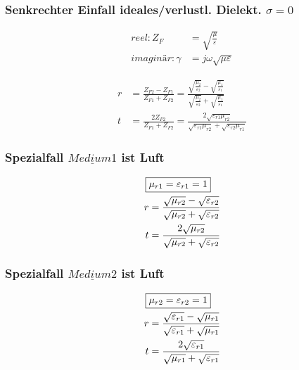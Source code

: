 \subsubsection{Senkrechter Einfall ideales/verlustl. Dielekt. $\sigma = 0$}


\begin{align*}
    reel: Z_F        & = \sqrt{\frac{\mu}{\varepsilon}}   \\
    imaginär: \gamma & = j \omega \sqrt{ \mu \varepsilon}
\end{align*}

\begin{align*}
    r & = \frac{Z_{F2} - Z_{F1}}{Z_{F1} + Z_{F2}} = \frac{\sqrt{\frac{\mu_2}{\varepsilon_2}} - \sqrt{\frac{\mu_1}{\varepsilon_1}}}{\sqrt{\frac{\mu_2}{\varepsilon_2}} + \sqrt{\frac{\mu_1}{\varepsilon_1}}} \\
    t & = \frac{2 Z_{F2}}{Z_{F1} + Z_{F2}} = \frac{2\sqrt{\varepsilon_{r1}\mu_{r2}}}{\sqrt{\varepsilon_{r1}\mu_{r2}}+\sqrt{\varepsilon_{r2}\mu_{r1}}}
\end{align*}


\subsubsection{Spezialfall $\underline{Medium 1}$ ist Luft}
\begin{align*}
    \Aboxed{ & \mu_{r1} = \varepsilon_{r1} = 1}                                                            \\
    r        & = \frac{\sqrt{\mu_{r2}}-\sqrt{\varepsilon_{r2}}}{{\sqrt{\mu_{r2}}+\sqrt{\varepsilon_{r2}}}} \\
    t        & = \frac{2\sqrt{\mu_{r2}}}{\sqrt{\mu_{r2}}+\sqrt{\varepsilon_{r2}}}
\end{align*}

\subsubsection{Spezialfall $\underline{Medium 2}$ ist Luft}
\begin{align*}
    \Aboxed{ & \mu_{r2} = \varepsilon_{r2} = 1}                                                            \\
    r        & = \frac{\sqrt{\varepsilon_{r1}}-\sqrt{\mu_{r1}}}{{\sqrt{\varepsilon_{r1}}+\sqrt{\mu_{r1}}}} \\
    t        & = \frac{2\sqrt{\varepsilon_{r1}}}{\sqrt{\mu_{r1}}+\sqrt{\varepsilon_{r1}}}
\end{align*}

